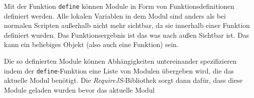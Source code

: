Mit der Funktion \texttt{define} können Module in Form von Funktionsdefinitionen  definiert werden.
Alle lokalen Variablen in dem Modul sind anders als bei  normalen Scripten außerhalb nicht mehr
sichtbar, da sie innerhalb einer  Funktion definiert wurden. Das Funktionsergebnis ist das was nach
außen Sichtbar  ist. Das kann ein beliebiges Objekt (also auch eine Funktion) sein.

Die so definierten Module können Abhängigkeiten untereinander spezifizieren  indem der
\texttt{define}-Funktion eine Liste von Modulen übergeben wird, die  das aktuelle Modul benötigt.
Die \textit{RequireJS}-Bibliothek sorgt dann dafür,  dass diese Module geladen wurden bevor das
aktuelle Modul